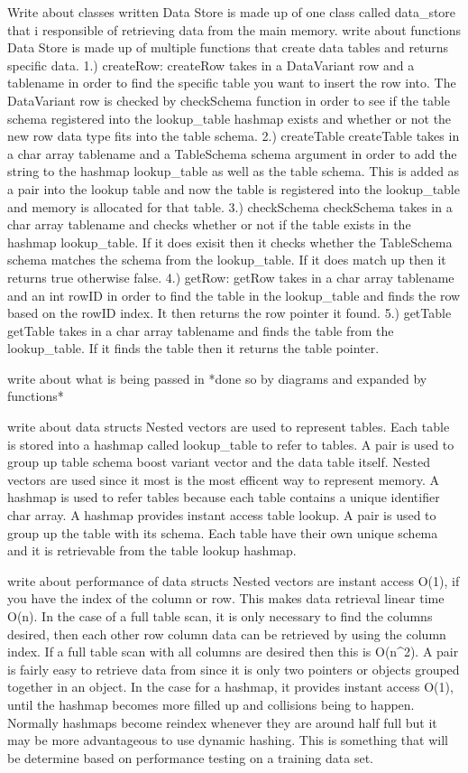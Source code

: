 \documentclass[letterpaper, 12pt]{article}
\begin{document}
Write about classes written
	Data Store is made up of one class called data_store that i responsible of retrieving
	data from the main memory. 
write about functions
	Data Store is made up of multiple functions that create data tables and returns specific data. 
1.) createRow:
		createRow takes in a DataVariant row and a tablename in order to find the specific table
		you want to insert the row into. The DataVariant row is checked by checkSchema function in 
		order to see if the table schema registered into the lookup_table hashmap exists and whether 
		or not the new row data type fits into the table schema.
2.) createTable
		createTable takes in a char array tablename and a TableSchema schema argument in order to add
		the string to the hashmap lookup_table as well as the table schema. This is added as a pair
		into the lookup table and now the table is registered into the lookup_table and memory is allocated
		for that table.
3.) checkSchema
		checkSchema takes in a char array tablename and checks whether or not if the table exists in the 
		hashmap lookup_table. If it does exisit then it checks whether the TableSchema schema matches the 
		schema from the lookup_table. If it does match up then it returns true otherwise false.
4.) getRow:
		getRow takes in a char array tablename and an int rowID in order to find the table in the lookup_table
		and finds the row based on the rowID index. It then returns the row pointer it found.
5.) getTable
		getTable takes in a char array tablename and finds the table from the lookup_table. If it finds the table
		then it returns the table pointer.

write about what is being passed in
*done so by diagrams and expanded by functions*

write about data structs
	Nested vectors are used to represent tables. Each table is stored into a hashmap called lookup_table to refer to
	tables. A pair is used to group up table schema boost variant vector and the data table itself. Nested vectors
	are used since it most is the most efficent way to represent memory. A hashmap is used to refer tables because each
	table contains a unique identifier char array. A hashmap provides instant access table lookup. A pair is used to group 
	up the table with its schema. Each table have their own unique schema and it is retrievable from the table lookup hashmap.

write about performance of data structs
	Nested vectors are instant access O(1), if you have the index of the column or row. This makes data retrieval
	linear time O(n). In the case of a full table scan, it is only necessary to find the columns desired, then each other row
	column data can be retrieved by using the column index. If a full table scan with all columns are desired then this is O(n^2).
	A pair is fairly easy to retrieve data from since it is only two pointers or objects grouped together in an object. In the case
	for a hashmap, it provides instant access O(1), until the hashmap becomes more filled up and collisions being to happen. Normally hashmaps
	become reindex whenever they are around half full but it may be more advantageous to use dynamic hashing. This is something that will be determine based on performance testing on a training data set.
\end{document}
